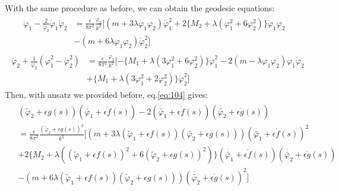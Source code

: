 With the same procedure as before, we can obtain the geodesic equations:
\begin{align}
    \label{eq:104}
    \begin{split}
    \ddot \varphi_{1} - \frac{2}{\varphi_{2}} \dot \varphi_{1} \dot \varphi_{2} &= \frac{\epsilon}{8\pi^{2}} \frac{\varphi_{2}}{k^{2}}[(m+3\lambda\varphi_{1}\varphi_{2})\dot \varphi_{1}^{2} + 2\lbrace M_{2} + \lambda(\varphi_{1}^{2} + 6\varphi_{2}^{2})\rbrace \dot \varphi_{1}\varphi_{2}  \\
    & - (m+6\lambda\varphi_{1}\varphi_{2})\dot \varphi_{2} ^{2}]
    \end{split}
\end{align}
\begin{align}
    \label{eq:105}
    \begin{split}
    \ddot \varphi_{2} + \frac{1}{\varphi_{2}} (\dot \varphi_{1}^{2} - \dot \varphi_{2}^{2}) &= \frac{\epsilon}{8\pi^{2}}\frac{\varphi_{2}}{k^{2}} [-\lbrace M_{1} +\lambda(3\varphi_{1}^{2} + 6\varphi_{2}^{2})\rbrace \dot \varphi_{1}^{2} - 2(m-\lambda\varphi_{1} \varphi_{2})\dot \varphi_{1} \dot \varphi_{2}  \\
    & + \lbrace M_{1} + \lambda (3\varphi_{1}^{2} + 2\varphi_{2}^{2}) \rbrace \dot \varphi_{2}^{2}]
    \end{split}
\end{align}
Then, with ansatz we provided before, eq.\ref{eq:104} gives:
\begin{align}
    \begin{split}
        &(\tilde \varphi_{2} + \epsilon g(s))(\ddot {\tilde {\varphi_{1}}} + \epsilon \ddot f(s)) - 2 (\dot {\tilde{\varphi_{1}}} + \epsilon \dot {f}(s))(\dot {\tilde{\varphi_{2}}} +\epsilon \dot{g}(s))  \\
        &= \frac{\epsilon}{8\pi^{2}} \frac{(\tilde {\varphi}_{2} + \epsilon g(s))^{2}}{k^{2}} [(m+3\lambda (\tilde {\varphi}_{1}+ \epsilon f(s)) (\tilde {\varphi_{2}}+\epsilon g(s)))(\dot {\tilde {\varphi_{1}}} + \epsilon \dot f(s))^{2} \\
        &+ 2\lbrace M_{2} + \lambda ((\tilde {\varphi}_{1} +\epsilon f(s))^{2} + 6(\tilde {\varphi}_{2} + \epsilon g(s))^{2}) \rbrace (\dot {\tilde {\varphi_{1}}} + \epsilon \dot f (s))(\dot {\tilde {\varphi_{2}}} + \epsilon \dot g (s)) \\
        & - (m+ 6\lambda (\tilde {\varphi}_{1} + \epsilon f(s))(\tilde {\varphi}_{2} + \epsilon g(s))) (\dot {\tilde {\varphi_{2}}} + \epsilon  \dot g(s))^{2}]
    \end{split}
\end{align}
